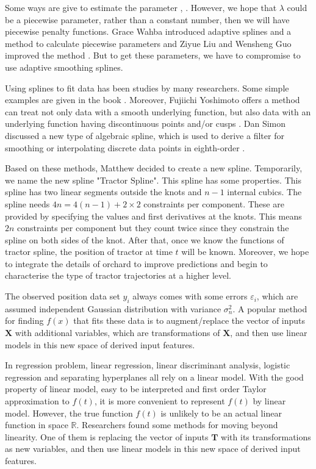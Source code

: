 Some ways are give to estimate the parameter \cite{smoothingparameter}, \cite{kim2004smoothing}. However, we hope that $\lambda$ could be a piecewise parameter, rather than a constant number, then we will have piecewise penalty functions. Grace Wahba introduced adaptive splines and a method to calculate piecewise parameters \cite{donoho1995wavelet} and Ziyue Liu and Wensheng Guo improved the method \cite{liu2010data}. But to get these parameters, we have to compromise to use adaptive smoothing splines. 

Using splines to fit data has been studies by many researchers. Some simple examples are given in the book \cite{ESLII}. Moreover, Fujiichi Yoshimoto offers a method can treat not only data with a smooth underlying function, but also data with an underlying function having discontinuous points and/or cusps \cite{yoshimoto2003}. Dan Simon discussed a new type of algebraic spline, which is used to derive a filter for smoothing or interpolating discrete data points in eighth-order \cite{simon2004data}.

Based on these methods, Matthew decided to create a new spline. Temporarily, we name the new spline "Tractor Spline". This spline has some properties. This spline has two linear segments outside the knots and $n-1$ internal cubics. The  spline needs $4n = 4(n -1)+ 2\times 2$ constraints per component. These are provided by specifying the values and first derivatives at the knots. This means $2n$ constraints per component but they count twice since they constrain the spline on both sides of the knot. After that, once we know the functions of tractor spline, the position of tractor at time $t$ will be known. Moreover, we hope to integrate the details of orchard to improve predictions and begin to characterise the type of tractor trajectories at a higher level.






The observed position data set $y_i$ always comes with some errors $\varepsilon_i$, which are assumed independent Gaussian distribution with variance $\sigma_n^2$. A popular method for finding $f(x)$ that fits these data is to augment/replace the vector of inputs $\mathbf{X}$ with additional variables, which are transformations of $\mathbf{X}$, and then use linear models in this new space of derived input features.\cite{esl2009}

In regression problem, linear regression, linear discriminant analysis, logistic regression and separating hyperplanes all rely on a linear model. With the good property of linear model, easy to be interpreted and first order Taylor approximation to $f(t)$, it is more convenient to represent $f(t)$ by linear model. However, the true function $f(t)$ is unlikely to be an actual linear function in space $\mathbb{R}$. Researchers found some methods for moving beyond linearity. One of them is replacing the vector of inputs $\mathbf{T}$ with its transformations as new variables, and then use linear models in this new space of derived input features.

